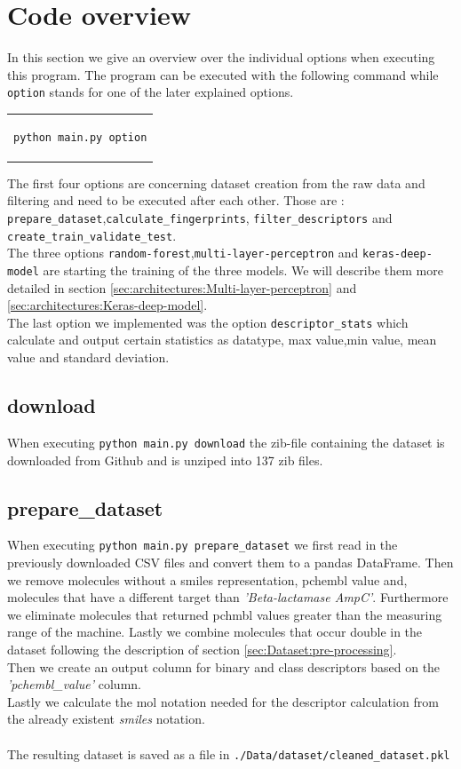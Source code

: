 \documentclass[12pt]{article}
\begin{document}
\section{Code overview}\label{sec:code}
In this section we give an overview over the individual options when executing this program. The program can be executed with the following command while \texttt{option} stands for one of the later explained options.
\begin{center}
\begin{tabular}{c}
\begin{lstlisting}[language=bash]
python main.py option
\end{lstlisting}
\end{tabular}
\end{center}
%
The first four options are concerning dataset creation from the raw data and filtering and need to be executed after each other. Those are : \texttt{prepare\_dataset},\texttt{calculate\_fingerprints}, \texttt{filter\_descriptors} and \texttt{create\_train\_validate\_test}.\\
The three options \texttt{random-forest},\texttt{multi-layer-perceptron} and \texttt{keras-deep-model} are starting the training of the three models. We will describe them more detailed in section \ref{sec:architectures:Multi-layer-perceptron} and \ref{sec:architectures:Keras-deep-model}.\\
The last option we implemented was the option \texttt{descriptor\_stats} which calculate and output certain statistics as datatype, max value,min value, mean value and standard deviation.

\subsection{download}
When executing \texttt{python main.py download} the zib-file containing the dataset is downloaded from Github and is unziped into 137 zib files. 

\subsection{prepare\_dataset}
When executing \texttt{python main.py prepare\_dataset} we first read in the previously downloaded CSV files and convert them to a pandas DataFrame. Then we remove molecules without a smiles representation, pchembl value and, molecules that have a different target than \textit{'Beta-lactamase AmpC'}. Furthermore we eliminate molecules that returned pchmbl values greater than the measuring range of the machine. Lastly we combine molecules that occur double in the dataset following the description of section \ref{sec:Dataset:pre-processing}.\\ Then we create an output column for binary and class descriptors based on the \textit{'pchembl\_value'} column.\\ Lastly we calculate the mol notation needed for the descriptor calculation from the already existent \textit{smiles} notation.\\\\
The resulting dataset is saved as a file in \texttt{./Data/dataset/cleaned\_dataset.pkl}
 
\end{document}

